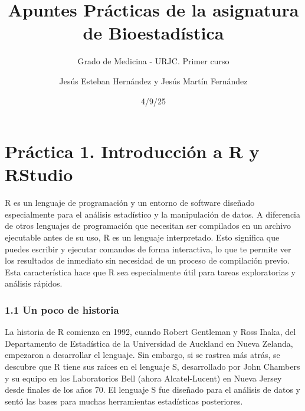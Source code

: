 \documentclass[
  letterpaper,
  DIV=11,
  numbers=noendperiod]{scrreprt}
\title{Apuntes Prácticas de la asignatura de Bioestadística}
\subtitle{Grado de Medicina - URJC. Primer curso}
\author{Jesús Esteban Hernández y Jesús Martín Fernández}
\date{4/9/25}
\renewcommand*\contentsname{Table of contents}
\newcommand\contentsname{Table of contents}
\begin{document}
\maketitle
\ifdefined\Shaded\renewenvironment{Shaded}{\begin{tcolorbox}[sharp corners, frame hidden, borderline west={3pt}{0pt}{shadecolor}, breakable, interior hidden, enhanced, boxrule=0pt]}{\end{tcolorbox}}\fi

\renewcommand*\contentsname{Table of contents}
{
\hypersetup{linkcolor=}
\setcounter{tocdepth}{2}
\tableofcontents
}

\hypertarget{section}{%
\chapter{}\label{section}}


\hypertarget{pruxe1ctica-1.-introducciuxf3n-a-r-y-rstudio}{%
\chapter{\texorpdfstring{{Práctica 1. Introducción a R y
RStudio}}{Práctica 1. Introducción a R y RStudio}}\label{pruxe1ctica-1.-introducciuxf3n-a-r-y-rstudio}}

R es un lenguaje de programación y un entorno de software diseñado
especialmente para el análisis estadístico y la manipulación de datos. A
diferencia de otros lenguajes de programación que necesitan ser
compilados en un archivo ejecutable antes de su uso, R es un lenguaje
interpretado. Esto significa que puedes escribir y ejecutar comandos de
forma interactiva, lo que te permite ver los resultados de inmediato sin
necesidad de un proceso de compilación previo. Esta característica hace
que R sea especialmente útil para tareas exploratorias y análisis
rápidos.

\hypertarget{un-poco-de-historia}{%
\subsection{1.1 Un poco de historia}\label{un-poco-de-historia}}

La historia de R comienza en 1992, cuando Robert Gentleman y Ross Ihaka,
del Departamento de Estadística de la Universidad de Auckland en Nueva
Zelanda, empezaron a desarrollar el lenguaje. Sin embargo, si se rastrea
más atrás, se descubre que R tiene sus raíces en el lenguaje S,
desarrollado por John Chambers y su equipo en los Laboratorios Bell
(ahora Alcatel-Lucent) en Nueva Jersey desde finales de los años 70. El
lenguaje S fue diseñado para el análisis de datos y sentó las bases para
muchas herramientas estadísticas posteriores.
\end{document}
